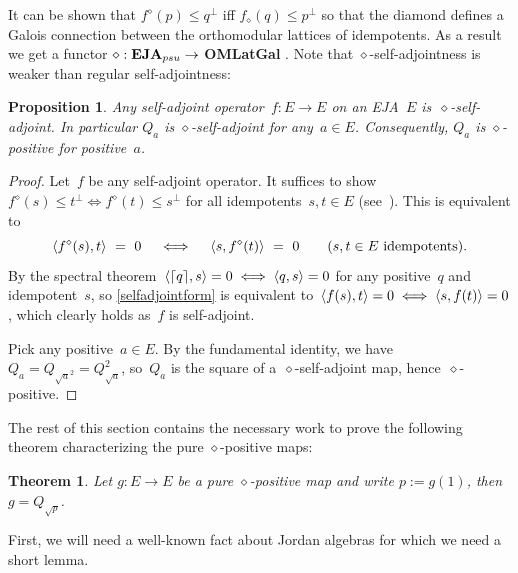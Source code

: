 \documentclass[submission,copyright,creativecommons]{eptcs}
\newcounter{main}
\newtheorem{theorem}[main]{Theorem}
\newtheorem{proposition}[main]{Proposition}
\theoremstyle{definition}
\DeclarePairedDelimiter{\ceil}{\lceil}{\rceil}
\DeclarePairedDelimiter{\inn}{\langle}{\rangle}
\newcommand{\EJA}{\text{\textbf{EJA}}\xspace}
\begin{document}
It can be shown that $f^\diamond(p)\leq q^\perp$ iff $f_\diamond(q)\leq p^\perp$ so that the diamond defines a Galois connection between the orthomodular lattices of idempotents. As a result we get a functor $\diamond: \EJA_{psu}\rightarrow $ \textbf{OMLatGal} \cite{basthesis}.
Note that $\diamond$-self-adjointness is weaker than regular self-adjointness:
\begin{proposition}\label{prop:diamond-adjointness}
    Any self-adjoint operator~$f:E\rightarrow E$ on an EJA~$E$
        is~$\diamond$-self-adjoint.
    In particular $Q_a$ is $\diamond$-self-adjoint for any~$a \in E$.
    Consequently, $Q_a$ is $\diamond$-positive for positive~$a$.
\end{proposition}
\begin{proof}
Let~$f$ be any self-adjoint operator.
It suffices to show~$f^\diamond(s) \leq t^\perp \iff f^\diamond(t) \leq s^\perp$
        for all idempotents~$s,t \in E$
    (see~\cite[\S207III]{basthesis}).
This is equivalent to
    \begin{equation}\label{selfadjointform}
        \inn{f^\diamond(s),t}\ =\ 0\quad \iff\quad  \inn{s,f^\diamond(t)} \ =\  0 \qquad (s,t \in E \text{ idempotents}).
    \end{equation}
By the spectral theorem~$\inn{\ceil{q},s} = 0 \iff \inn{q,s}=0$
    for any positive~$q$ and idempotent~$s$,
    so \eqref{selfadjointform}
    is equivalent to~$\inn{f(s),t} = 0 \iff \inn{s,f(t)}=0$,
        which clearly holds as~$f$ is self-adjoint.

Pick any positive~$a\in E$.
    By the fundamental identity, we have~$Q_a = Q_{\sqrt{a}^2} = Q_{\sqrt{a}}^2$,
        so~$Q_a$ is the square of a~$\diamond$-self-adjoint map,
            hence~$\diamond$-positive.
\end{proof}


The rest of this section contains the necessary work to prove the following theorem characterizing the pure $\diamond$-positive maps:
\begin{theorem}
    \label{super-duper-theorem}
    Let $g: E\rightarrow E$ be a pure $\diamond$-positive map and write $p:= g(1)$, then $g = Q_{\sqrt{p}}$.
\end{theorem}

First, we will need a well-known fact about Jordan algebras for which we need a short lemma.
\end{document}
